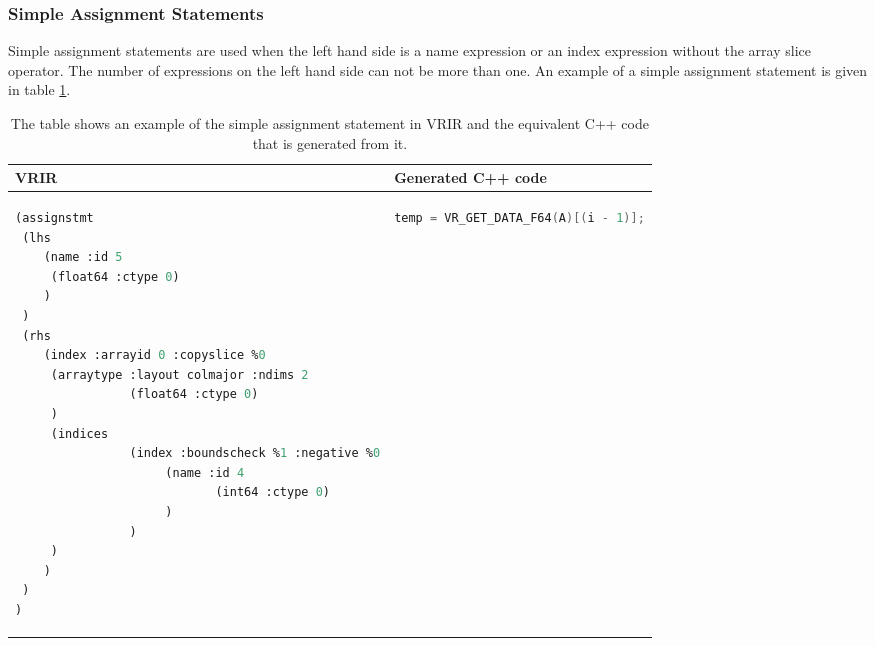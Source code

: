 \subsubsection{Simple Assignment Statements}
Simple assignment statements are used when the left hand side is a name expression or an index expression without the array slice operator. The number of expressions on the left hand side can not be more than one. An example of a simple assignment statement is given in table \ref{tab:simpleAssignment}.
	\begin{table}[htbp]
	\begin{tabular}{|l|l|}
					\hline
							VRIR & Generated C++ code\\
							\hline
{
\begin{lstlisting}[frame=none, language=lisp, label={lst:SimpleAssignment},numbers=none]
(assignstmt
 (lhs
	(name :id 5
	 (float64 :ctype 0)
	)
 )
 (rhs
	(index :arrayid 0 :copyslice %0
	 (arraytype :layout colmajor :ndims 2
				(float64 :ctype 0)
	 )
	 (indices
				(index :boundscheck %1 :negative %0
					 (name :id 4
							(int64 :ctype 0)
					 )
				)
	 )
	)
 )
)
\end{lstlisting}
} & 
{
\begin{lstlisting}[frame=none, language=c, label={lst:SimpleAssignment},numbers=none]
temp = VR_GET_DATA_F64(A)[(i - 1)];
\end{lstlisting}
} \\
\hline
\end{tabular}
\caption[Simple Assignment Statement]{ The table shows an example of the simple assignment statement in VRIR and the equivalent C++ code that is generated from it.}
\label{tab:simpleAssignment}
\end{table}
